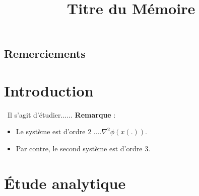 \documentclass[a4paper,11pt]{book}
\theoremstyle{theo}
\begin{document}
\let\cleardoublepage\clearpage
\title{  Titre du M\'emoire}





\maketitle

\newpage
\section*{Remerciements}
\bigskip
\pagestyle{plain}
\bigskip
\newpage 
\tableofcontents
\newpage
\chapter{Introduction }
\
Il s'agit d'\'etudier......
\textbf{Remarque} : 
\begin{itemize}
\item Le système est d'ordre 2 ....$\nabla^2\phi(x(.))$. 
\item Par contre, le second système est d'ordre 3.
\end{itemize}
\par


\bigskip
\thispagestyle{empty}


\newpage


\newpage
\chapter{\'Etude analytique}
\pagestyle{fancy}
\fancyhf{}
\fancyhead[L]{\leftmark}
\fancyfoot[C]{\thepage}
\end{document}

